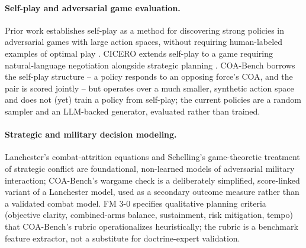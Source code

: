 \documentclass[letterpaper]{article} %
\begin{document}
\paragraph{Self-play and adversarial game evaluation.} Prior work establishes self-play as a method for discovering strong policies in adversarial games with large action spaces, without requiring human-labeled examples of optimal play \citep{silver2018alphazero,vinyals2019alphastar,brown2019superhuman}. CICERO extends self-play to a game requiring natural-language negotiation alongside strategic planning \citep{bakhtin2022cicero}. COA-Bench borrows the self-play structure -- a policy responds to an opposing force's COA, and the pair is scored jointly -- but operates over a much smaller, synthetic action space and does not (yet) train a policy from self-play; the current policies are a random sampler and an LLM-backed generator, evaluated rather than trained.

\paragraph{Strategic and military decision modeling.} Lanchester's combat-attrition equations \citep{lanchester1916} and Schelling's game-theoretic treatment of strategic conflict \citep{schelling1960} are foundational, non-learned models of adversarial military interaction; COA-Bench's wargame check is a deliberately simplified, score-linked variant of a Lanchester model, used as a secondary outcome measure rather than a validated combat model. FM 3-0 \citep{fm30} specifies qualitative planning criteria (objective clarity, combined-arms balance, sustainment, risk mitigation, tempo) that COA-Bench's rubric operationalizes heuristically; the rubric is a benchmark feature extractor, not a substitute for doctrine-expert validation.
\end{document}
